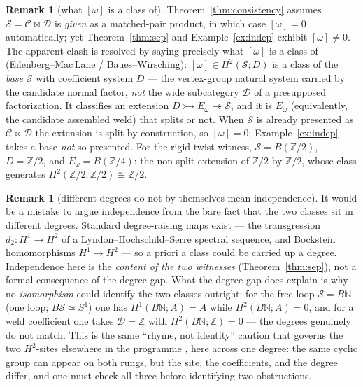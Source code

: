 \documentclass[11pt]{article}
\theoremstyle{definition}
\newtheorem{remark}[theorem]{Remark}
\newcommand{\N}{\mathbb{N}}
\newcommand{\Z}{\mathbb{Z}}
\newcommand{\sS}{\mathcal{S}}
\newcommand{\cC}{\mathcal{C}}
\newcommand{\cD}{\mathcal{D}}
\begin{document}
\begin{remark}[{what $[\omega]$ is a class of}]\label{rem:whatomega}
Theorem~\ref{thm:consistency} assumes $\sS=\cC\bowtie\cD$ is \emph{given} as a matched-pair product,
in which case $[\omega]=0$ automatically; yet Theorem~\ref{thm:sep} and Example~\ref{ex:indep} exhibit
$[\omega]\neq0$. The apparent clash is resolved by saying precisely what $[\omega]$ is a class of
(Eilenberg--Mac\,Lane / Baues--Wirsching): $[\omega]\in H^2(\sS;D)$ is a class of the \emph{base}
$\sS$ with coefficient system $D$ --- the vertex-group natural system carried by the candidate normal
factor, \emph{not} the wide subcategory $\cD$ of a presupposed factorization. It classifies an
extension $D\rightarrowtail E_\omega\twoheadrightarrow\sS$, and it is $E_\omega$ (equivalently, the
candidate assembled weld) that splits or not. When $\sS$ is already presented as $\cC\bowtie\cD$ the
extension is split by construction, so $[\omega]=0$; Example~\ref{ex:indep} takes a base \emph{not} so
presented. For the rigid-twist witness, $\sS=B(\Z/2)$, $D=\Z/2$, and $E_\omega=B(\Z/4)$: the non-split
extension of $\Z/2$ by $\Z/2$, whose class generates $H^2(\Z/2;\Z/2)\cong\Z/2$.
\end{remark}

\begin{remark}[different degrees do not by themselves mean independence]\label{rem:nocollapse}
It would be a mistake to argue independence from the bare fact that the two classes sit in different
degrees. Standard degree-raising maps exist --- the transgression $d_2\colon H^1\to H^2$ of a
Lyndon--Hochschild--Serre spectral sequence, and Bockstein homomorphisms $H^1\to H^2$ --- so a priori
a class could be carried up a degree. Independence here is the \emph{content of the two witnesses}
(Theorem~\ref{thm:sep}), not a formal consequence of the degree gap. What the degree gap does explain
is why no \emph{isomorphism} could identify the two classes outright: for the free loop $\sS=B\N$ (one
loop; $B\sS\simeq S^1$) one has $H^1(B\N;A)=A$ while $H^2(B\N;A)=0$, and for a weld coefficient one
takes $\cD=\Z$ with $H^2(B\N;\Z)=0$ --- the degrees genuinely do not match. This is the same ``rhyme,
not identity'' caution that governs the two $H^2$-sites elsewhere in the programme \cite{MacBethZS},
here across one degree: the same cyclic group can appear on both rungs, but the site, the coefficients,
and the degree differ, and one must check all three before identifying two obstructions.
\end{remark}
\end{document}
